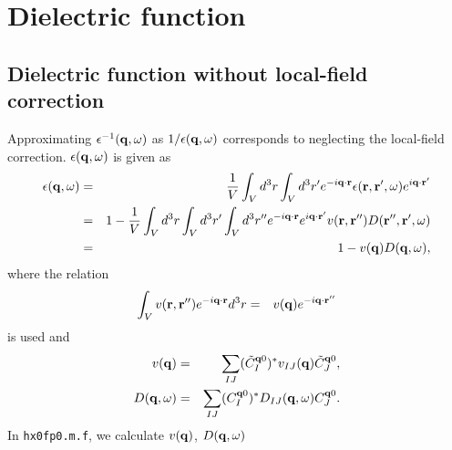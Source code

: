 \documentclass[a4paper,10pt,epsf,fleqn]{article}
\begin{document}
%


\newpage

\section{Dielectric function}

\subsection{Dielectric function without local-field correction}

Approximating $\epsilon^{-1}({\bf q},\omega)$ as $1/\epsilon({\bf q},\omega)$
corresponds to neglecting the local-field correction.
$\epsilon({\bf q},\omega)$ is given as 
\begin{eqnarray}
  \epsilon({\bf q},\omega) 
 &=& \frac{1}{V}
  \int_V d^3r \int_V d^3r' e^{-i{\bf q}\cdot{\bf r}}
  \epsilon({\bf r},{\bf r}',\omega)e^{i{\bf q}\cdot{\bf r}'} \nonumber \\
 &=& 1 - \frac{1}{V} \int_V d^3r \int_V d^3r' \int_V d^3r''
  e^{-i{\bf q}\cdot{\bf r}} e^{i{\bf q}\cdot{\bf r}'} 
  v({\bf r,r''})D({\bf r'',r'},\omega)  \nonumber \\
 &=& 1 - v({\bf q})D({\bf q},\omega),
           \label{eq. eps1}
\end{eqnarray}
where the relation
\begin{eqnarray}
   \int_V v({\bf r},{\bf r}'')e^{-i{\bf q}\cdot{\bf r}}d^3r 
  &=& v({\bf q})e^{-i{\bf q \cdot r''}}
\end{eqnarray}
is used and 
\begin{eqnarray}
   v({\bf q}) &=& \sum_{IJ}( \tilde{C}^{{\bf q}0}_I )^*
                v_{IJ}({\bf q})\tilde{C}^{{\bf q}0}_J , \\
   D({\bf q},\omega) 
              &=& \sum_{IJ}( C^{{\bf q}0}_I )^*
                D_{IJ}({\bf q},\omega) C^{{\bf q}0}_J.     
\end{eqnarray}
In \verb|hx0fp0.m.f|, we calculate $v({\bf q})$, $D({\bf q},\omega)$ 
\end{document}
